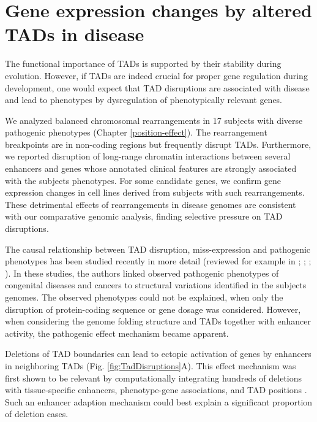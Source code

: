 \documentclass[a4paper,twoside=true,openright,parskip=full,chapterprefix=true,11pt,headings=normal,bibliography=totoc,listof=totoc,titlepage=on,captions=tableabove,draft=false]{scrreprt}
\theoremstyle{definition}
\theoremstyle{definition}
\theoremstyle{definition}
\theoremstyle{remark}
\begin{document}
\hypertarget{TAD-disease}{%
\section{Gene expression changes by altered TADs in
disease}\label{TAD-disease}}

The functional importance of TADs is supported by their stability during
evolution. However, if TADs are indeed crucial for proper gene
regulation during development, one would expect that TAD disruptions are
associated with disease and lead to phenotypes by dysregulation of
phenotypically relevant genes.

We analyzed balanced chromosomal rearrangements in 17 subjects with
diverse pathogenic phenotypes (Chapter \ref{position-effect}). The
rearrangement breakpoints are in non-coding regions but frequently
disrupt TADs. Furthermore, we reported disruption of long-range
chromatin interactions between several enhancers and genes whose
annotated clinical features are strongly associated with the subjects
phenotypes. For some candidate genes, we confirm gene expression changes
in cell lines derived from subjects with such rearrangements. These
detrimental effects of rearrangements in disease genomes are consistent
with our comparative genomic analysis, finding selective pressure on TAD
disruptions.

The causal relationship between TAD disruption, miss-expression and
pathogenic phenotypes has been studied recently in more detail (reviewed
for example in \citet{Krijger2016}; \citet{Achinger-Kawecka2017};
\citet{Yu2017}; \citet{Andrey2017}). In these studies, the authors
linked observed pathogenic phenotypes of congenital diseases and cancers
to structural variations identified in the subjects genomes. The
observed phenotypes could not be explained, when only the disruption of
protein-coding sequence or gene dosage was considered. However, when
considering the genome folding structure and TADs together with enhancer
activity, the pathogenic effect mechanism became apparent.

Deletions of TAD boundaries can lead to ectopic activation of genes by
enhancers in neighboring TADs (Fig. \ref{fig:TadDisruptions}A). This
effect mechanism was first shown to be relevant by computationally
integrating hundreds of deletions with tissue-specific enhancers,
phenotype-gene associations, and TAD positions \citep{Ibn-Salem2014}.
Such an enhancer adaption mechanism could best explain a significant
proportion of deletion cases.
\end{document}

